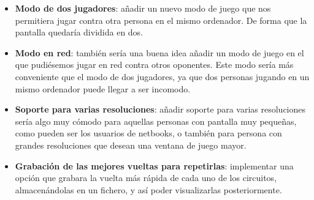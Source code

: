 \begin{itemize}
    \item \textbf{Modo de dos jugadores}: añadir un nuevo modo de juego que nos permitiera jugar contra otra persona en el mismo
    ordenador. De forma que la pantalla quedaría dividida en dos.
    
    \item \textbf{Modo en red}: también sería una buena idea añadir un modo de
    juego en el que pudiésemos jugar en red contra otros
    oponentes. Este modo sería más conveniente que el modo de dos jugadores, ya que dos personas jugando en un mismo ordenador
    puede llegar a ser incomodo.
    
    
    \item \textbf{Soporte para varias resoluciones}: añadir soporte para varias resoluciones sería algo muy cómodo para aquellas 
    personas con pantalla muy pequeñas, como pueden ser los usuarios de netbooks, o también para persona con grandes resoluciones
    que desean una ventana de juego mayor.
    
    
    
    \item \textbf{Grabación de las mejores vueltas para repetirlas}: implementar una opción que grabara la vuelta más rápida de
    cada uno de los circuitos, almacenándolas en un fichero, y así poder visualizarlas posteriormente.
\end{itemize}
